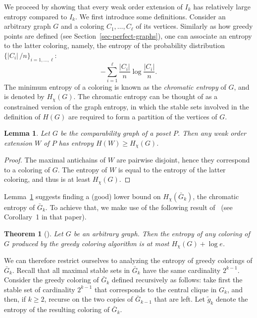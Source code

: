 \documentclass[12pt,oneside]{article}
\newtheorem{lemma}{Lemma}
\newtheorem{theorem}{Theorem}
\begin{document}
We proceed by showing that every weak order extension of $I_{k}$ has relatively large entropy
compared to $I_{k}$. We first introduce some definitions.
Consider an arbitrary graph $G$ and a coloring $C_{1}, \dots, C_{\ell}$ of its vertices.
Similarly as how greedy points are defined (see Section~\ref{sec-perfect-graphs}),
one can associate an entropy to the latter coloring, namely, the entropy of the
probability distribution $\{ |C_i|\,/ n\}_{i = 1, \ldots, \ell}$:
$$
-\sum_{i=1}^{\ell} \frac{|C_{i}|}{n} \log \frac{|C_{i}|}{n}.
$$
The minimum entropy of a coloring is known as the {\em chromatic entropy} of $G$,
and is denoted by $H_{\chi}(G)$.
The chromatic entropy can be thought of as a constrained version of the
graph entropy, in which the stable sets involved in the definition of $H(G)$ are
required to form a partition of the vertices of $G$.

\begin{lemma}
\label{lem-chromatic-entropy}
Let $G$ be the comparability graph of a poset $P$.
Then any weak order extension $W$ of $P$ has entropy
$H(W)\geq H_{\chi} (G)$.
\end{lemma}
\begin{proof}
The maximal antichains of $W$ are pairwise disjoint, hence they correspond to a coloring of $G$.
The entropy of $W$ is equal to the entropy of the latter coloring, and thus is at least $H_{\chi}(G)$.
\end{proof}

Lemma~\ref{lem-chromatic-entropy} suggests finding a (good) lower bound on
$H_{\chi}(\bar G_{k})$, the chromatic entropy of $\bar G_{k}$. To achieve that, we
make use of the following result of~\cite{CFJ08-ALGO} (see Corollary~1 in that paper).

\begin{theorem}[\hspace{-.01em}\cite{CFJ08-ALGO}]
\label{th-ALGO}
Let $G$ be an arbitrary graph. Then the entropy of any coloring of $G$ produced by the
greedy coloring algorithm is at most $H_{\chi}(G) + \log e$.
\end{theorem}

We can therefore restrict ourselves to analyzing the entropy of greedy colorings of $\bar G_{k}$.
Recall that all maximal stable sets in $\bar G_{k}$ have the same cardinality $2^{k-1}$.
Consider the greedy coloring of $\bar G_{k}$ defined recursively as follows: take first
the stable set of cardinality $2^{k-1}$ that corresponds to the central clique in $G_{k}$, and
then, if $k\geq 2$, recurse on the two copies of $\bar G_{k-1}$ that are left.
Let $\tilde g_{k}$ denote the entropy of the resulting coloring of $\bar G_{k}$.
\end{document}
